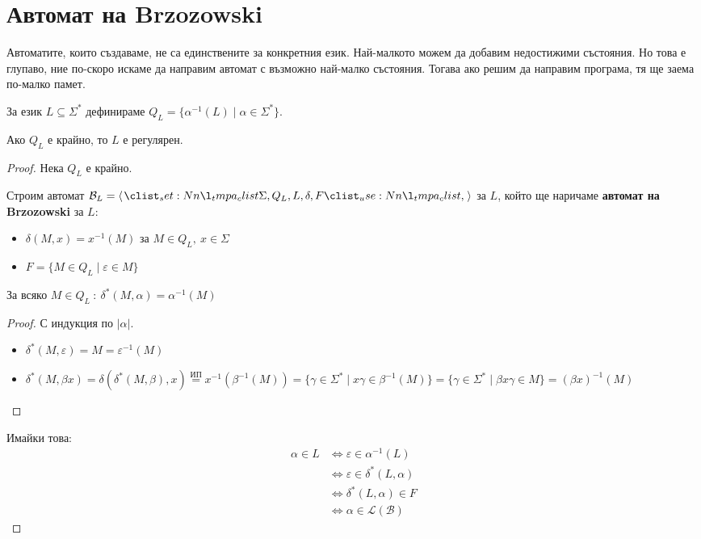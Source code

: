 \section{Автомат на Brzozowski}

Автоматите, които създаваме, не са единствените за конкретния език.
Най-малкото можем да добавим недостижими състояния.
Но това е глупаво, ние по-скоро искаме да направим автомат с възможно най-малко състояния.
Тогава ако решим да направим програма, тя ще заема по-малко памет.

\begin{definition}
    За език $L \subseteq \Sigma^*$ дефинираме $Q_L = \{ \alpha^{-1}(L) \mid \alpha \in \Sigma^* \}$.
\end{definition}

\begin{claim}
    Ако $Q_L$ е крайно, то $L$ е регулярен.
\end{claim}

\begin{proof}
    Нека $Q_L$ е крайно.

    Строим автомат $\mathcal{B}_L = \opair{\Sigma, Q_L, L, \delta, F}$ за $L$, който ще наричаме \textbf{автомат на Brzozowski} за $L$:

    \begin{itemize}
        \item $\delta(M, x) = x^{-1}(M)$ за $M \in Q_L, \: x \in \Sigma$
        \item $F = \{ M \in Q_L \mid \varepsilon \in M \}$
    \end{itemize}

    \begin{claim}
        За всяко $M \in Q_L \: : \: \delta^*(M, \alpha) = \alpha^{-1}(M)$
    \end{claim}

    \begin{proof}
        С индукция по $|\alpha|$.

        \begin{itemize}
            \item $\delta^*(M, \varepsilon) = M = \varepsilon^{-1}(M)$ \checkmark
            \item $\delta^*(M, \beta x) = \delta(\delta^*(M, \beta), x) \stackrel{\text{ИП}}{=} x^{-1}(\beta^{-1}(M)) = \{ \gamma \in \Sigma^* \mid x \gamma \in \beta^{-1}(M) \} = \{ \gamma \in \Sigma^* \mid \beta x \gamma \in M \} = (\beta x)^{-1}(M)$
        \end{itemize}
    \end{proof}

    Имайки това:
    \begin{align*}
        \alpha \in L & \iff \varepsilon \in \alpha^{-1}(L)      \\
                     & \iff \varepsilon \in \delta^*(L, \alpha) \\
                     & \iff \delta^*(L, \alpha) \in F           \\
                     & \iff \alpha \in \mathcal{L(B)}
    \end{align*}
\end{proof}

